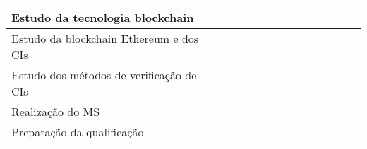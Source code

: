 \begin{table}[!ht]
\begin{tabular}{|l|l|l|l|l|l|l|l|l|l|l|l|l|l|}
\hline
Estudo da tecnologia blockchain          &                                       &                                       & {\cellcolor[rgb]{0.396,0.396,0.396}}  & {\cellcolor[rgb]{0.396,0.396,0.396}}  & {\cellcolor[rgb]{0.396,0.396,0.396}}  &                                       &                                       &                                       &                                       &                                       &                                       &                                       &                                        \\ 
\hline
Estudo da blockchain Ethereum e dos CIs  &                                       &                                       & {\cellcolor[rgb]{0.396,0.396,0.396}}  & {\cellcolor[rgb]{0.396,0.396,0.396}}  & {\cellcolor[rgb]{0.396,0.396,0.396}}  & {\cellcolor[rgb]{0.396,0.396,0.396}}  & {\cellcolor[rgb]{0.396,0.396,0.396}}  & {\cellcolor[rgb]{0.396,0.396,0.396}}  & {\cellcolor[rgb]{0.396,0.396,0.396}}  &                                       &                                       &                                       &                                        \\ 
\hline
Estudo dos métodos de verificação de CIs &                                       &                                       &                                       & {\cellcolor[rgb]{0.396,0.396,0.396}}  & {\cellcolor[rgb]{0.396,0.396,0.396}}  & {\cellcolor[rgb]{0.396,0.396,0.396}}  & {\cellcolor[rgb]{0.396,0.396,0.396}}  & {\cellcolor[rgb]{0.396,0.396,0.396}}  & {\cellcolor[rgb]{0.396,0.396,0.396}}  &                                       &                                       &                                       &                                        \\ 
\hline
Realização do MS                         &                                       &                                       &                                       & {\cellcolor[rgb]{0.396,0.396,0.396}}  & {\cellcolor[rgb]{0.396,0.396,0.396}}  & {\cellcolor[rgb]{0.396,0.396,0.396}}  & {\cellcolor[rgb]{0.396,0.396,0.396}}  & {\cellcolor[rgb]{0.396,0.396,0.396}}  &                                       &                                       &                                       &                                       &                                        \\ 
\hline
Preparação da qualificação               &                                       &                                       &                                       &                                       &                                       & {\cellcolor[rgb]{0.396,0.396,0.396}}  & {\cellcolor[rgb]{0.396,0.396,0.396}}  & {\cellcolor[rgb]{0.396,0.396,0.396}}  &                                       &                                       &                                       &                                       &                                        \\ 

\end{tabular}
\end{table}
